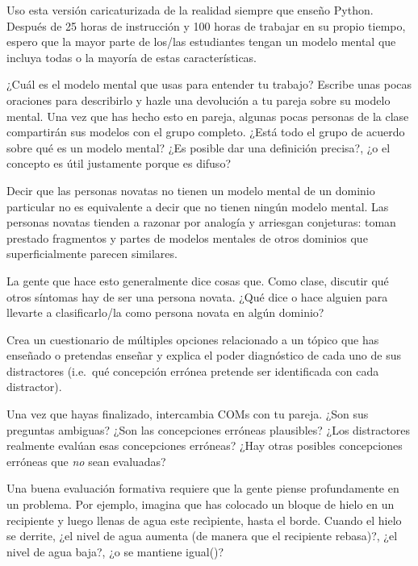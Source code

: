 Uso esta versión caricaturizada de la realidad siempre que enseño Python.
Después de 25 horas de instrucción y 100 horas de trabajar en su propio tiempo,
espero que la mayor parte de los/las estudiantes tengan un modelo mental
que incluya todas o la mayoría de estas características.



¿Cuál es el modelo mental que usas para entender tu trabajo?
Escribe unas pocas oraciones para describirlo y hazle una devolución a tu pareja sobre su modelo mental.
Una vez que has hecho esto en pareja,
algunas pocas personas de la clase compartirán sus modelos con el grupo completo.
¿Está todo el grupo de acuerdo sobre qué es un modelo mental?
¿Es posible dar una definición precisa?,
¿o el concepto es útil justamente porque es difuso?

Decir que las personas novatas no tienen un modelo mental de un dominio particular
no es equivalente a decir que no tienen ningún modelo mental.
Las personas novatas tienden a razonar por analogía y arriesgan conjeturas:
toman prestado fragmentos y partes de modelos mentales de otros dominios que superficialmente parecen similares.

La gente que hace esto generalmente dice cosas que.
Como clase,
discutir qué otros síntomas hay de ser una persona novata.
¿Qué dice o hace alguien para llevarte a clasificarlo/la como persona novata en algún dominio?

Crea un cuestionario de múltiples opciones relacionado a un tópico que has enseñado o pretendas enseñar
y explica el poder diagnóstico de cada uno de sus distractores
(i.e.\ qué concepción errónea pretende ser identificada con cada distractor).

Una vez que hayas finalizado, intercambia COMs con tu pareja.
¿Son sus preguntas ambiguas?
¿Son las concepciones erróneas plausibles?
¿Los distractores realmente evalúan esas concepciones erróneas?
¿Hay otras posibles concepciones erróneas que \emph{no} sean evaluadas?

Una buena evaluación formativa requiere que la gente piense profundamente en un problema.
Por ejemplo,
imagina que has colocado un bloque de hielo en un recipiente y luego llenas de agua este recìpiente, hasta el borde.
Cuando el hielo se derrite, ¿el nivel de agua aumenta (de manera que el recipiente rebasa)?, ¿el nivel de agua baja?, ¿o se mantiene igual()?

